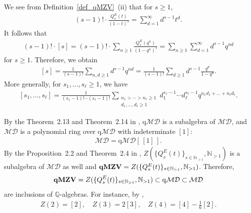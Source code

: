\documentclass[12pt, reqno]{amsart}
\theoremstyle{definition}
\theoremstyle{remark}
\numberwithin{equation}{section}
\newcommand{\MD}{\mathcal {MD}}
\newcommand{\N}{ \mathbb N }
\newcommand{\Q}{ \mathbb Q }
\newcommand{\qMD}{{\rm q}{\mathcal {MD}}}
\newcommand{\qMZV}{ {\bf qMZV} }
\numberwithin{equation}{section}
\begin{document}
We see from Definition~\ref{def_qMZV}~(ii) that for $s \ge 1$, 
\begin{eqnarray}   \label{def_qMZV.03}
(s-1)! \cdot \frac{Q_{s}^E(t)}{(1-t)^s} = \sum_{d=1}^\infty d^{s-1}t^d.
\end{eqnarray} 
It follows that 
\begin{eqnarray*}   
  (s-1)! \cdot [s] 
= (s-1)! \cdot \sum_{n \ge 1} \frac{Q_{s}^E(q^n)}{(1-q^n)^s} 
= \sum_{n \ge 1} \sum_{d=1}^\infty d^{s-1} q^{nd}
\end{eqnarray*} 
for $s \ge 1$. Therefore, we obtain
\begin{eqnarray}   \label{def_qMZV.04}
  [s] 
= \frac{1}{(s-1)!} \sum_{n, d \ge 1} d^{s-1} q^{nd}
= \frac{1}{(s-1)!} \sum_{d \ge 1} d^{s-1} \frac{q^{d}}{1-q^d}.
\end{eqnarray}  
More generally, for $s_1, \ldots, s_\ell \ge 1$, we have
\begin{eqnarray}   \label{def_qMZV.05}
  [s_1, \ldots, s_\ell] 
= \frac{1}{(s_1-1)! \cdots (s_\ell-1)!} 
  \sum_{\substack{n_1 > \cdots > n_\ell \ge 1\\d_1, \ldots, d_\ell \ge 1}} 
  d_1^{s_1-1} \cdots d_\ell^{s_\ell-1} q^{n_1d_1+\ldots+n_\ell d_\ell}.
\end{eqnarray} 

By the Theorem~2.13 and Theorem~2.14 in \cite{BK1},
$\text{q}\mathcal {MD}$ is a subalgebra of $\mathcal {MD}$, 
and $\mathcal {MD}$ is a polynomial ring over $\text{q}\mathcal {MD}$ 
with indeterminate $[1]$:
\begin{eqnarray}   \label{BK1Thm214}
\mathcal {MD} = \text{q}\mathcal {MD}[\,[1]\,].
\end{eqnarray}
By the Proposition~2.2 and Theorem~2.4 in \cite{BK3}, 
$Z(\{Q_s^E(t)\}_{s \in \N_{>1}}, \N_{>1})$ is a subalgebra of 
$\mathcal {MD}$ as well and 
$\qMZV = Z(\{Q_s^E(t)\}_{s \in \N_{>1}}, \N_{>1})$. Therefore,   
\begin{eqnarray}   \label{BK3-2.4}
\qMZV = Z(\{Q_s^E(t)\}_{s \in \N_{>1}}, \N_{>1}) \subset \qMD \subset \MD
\end{eqnarray} 
are inclusions of $\Q$-algebras.  
For instance, by \cite[Example~2.6]{BK3}, 
\begin{eqnarray}   \label{BK3-2.6}
Z(2) = [2], \quad Z(3) = 2[3], \quad Z(4) = [4] - \frac16 [2].
\end{eqnarray}
\end{document}
